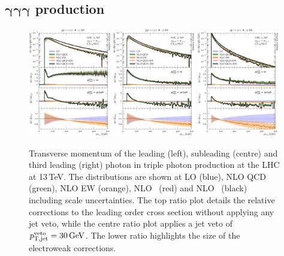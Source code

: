 \subsection[\texorpdfstring{$\gamma\gamma\gamma$}{aaa} production]
           {$\boldsymbol{\gamma\gamma\gamma}$ production}
\label{sec:results:aaa}

\begin{figure}[t!]
  \centering
  \includegraphics[width=0.32\textwidth]{figs_aaa/pT_y1}
  \includegraphics[width=0.32\textwidth]{figs_aaa/pT_y2}
  \includegraphics[width=0.32\textwidth]{figs_aaa/pT_y3}
  \caption{
    Transverse momentum of the leading (left), subleading (centre) 
    and third leading (right) photon 
    in triple photon production at the LHC at 13\,TeV. 
    The distributions are shown at LO (blue), NLO QCD (green), 
    NLO EW (orange), NLO \QCDpEW\ (red) and NLO \QCDtEW\ (black) 
    including scale uncertainties. The top ratio plot details 
    the relative corrections to the leading order cross section 
    without applying any jet veto, while the centre ratio plot 
    applies a jet veto of $p_\mathrm{T,jet}^\mathrm{veto}=\text{30\,GeV}$. 
    The lower ratio highlights the size of the electroweak corrections.
    \label{fig:aaa:pt}
  }
\end{figure}

